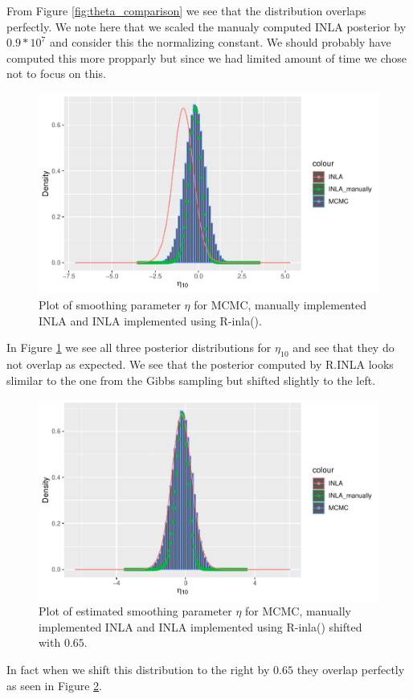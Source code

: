 From Figure \ref{fig:theta_comparison} we see that the distribution overlaps perfectly. We note here that we scaled the manualy computed INLA posterior by $0.9*10^7$ and consider this the normalizing constant. We should probably have computed this more propparly but since we had limited amount of time we chose not to focus on this. 

\begin{figure}[H]
    \centering
    \includegraphics[width=\textwidth]{Images/smoothing_comparison.pdf}
    \caption{Plot of smoothing parameter $\eta$ for MCMC, manually implemented INLA and INLA implemented using R-inla().}
    \label{fig:smoothing_comparison}
\end{figure}

In Figure \ref{fig:smoothing_comparison} we see all three posterior distributions for $\eta_{10}$ and see that they do not overlap as expected. We see that the posterior computed by R.INLA looks slimilar to the one from the Gibbs sampling but shifted slightly to the left. 

\begin{figure}[H]
    \centering
    \includegraphics[width=\textwidth]{Images/smoothing_comparison_shifted.pdf}
    \caption{Plot of estimated smoothing parameter $\eta$ for MCMC, manually implemented INLA and INLA implemented using R-inla() shifted with $0.65$.}
    \label{fig:smoothing_shift}
\end{figure}
In fact when we shift this distribution to the right by $0.65$ they overlap perfectly as seen in Figure \ref{fig:smoothing_shift}. 


